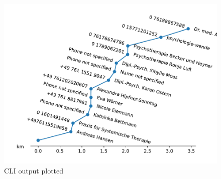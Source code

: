 \documentclass[runningheads]{llncs}
\begin{document}
\begin{figure}
    \includegraphics[width=\textwidth]{../images/freiburg_psychotherapists_distance}
    \caption{CLI output plotted} \label{fig4}
    \end{figure}
\end{document}
